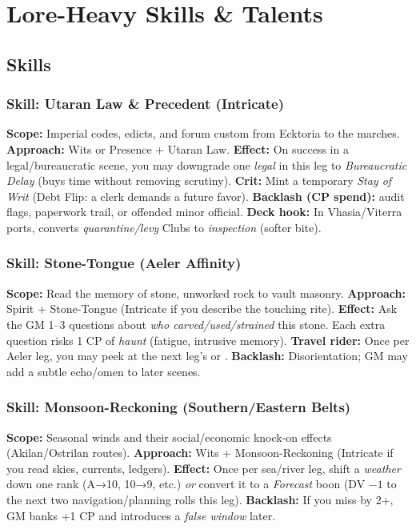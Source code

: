 \chapter{Lore-Heavy Skills \& Talents}

\section{Skills}

\subsection{Skill: Utaran Law \& Precedent (Intricate)}
\textbf{Scope:} Imperial codes, edicts, and forum custom from Ecktoria to the marches.
\textbf{Approach:} Wits or Presence + Utaran Law.
\textbf{Effect:} On success in a legal/bureaucratic scene, you may downgrade one \emph{legal} \SuitClub{} in this leg to \emph{Bureaucratic Delay} (buys time without removing scrutiny).
\textbf{Crit:} Mint a temporary \SuitDiamond{} \emph{Stay of Writ} (Debt Flip: a clerk demands a future favor).
\textbf{Backlash (CP spend):} audit flags, paperwork trail, or offended minor official.
\textbf{Deck hook:} In Vhasia/Viterra ports, converts \emph{quarantine/levy} Clubs to \emph{inspection} (softer bite).

\subsection{Skill: Stone-Tongue (Aeler Affinity)}
\textbf{Scope:} Read the memory of stone, unworked rock to vault masonry.
\textbf{Approach:} Spirit + Stone-Tongue (Intricate if you describe the touching rite).
\textbf{Effect:} Ask the GM 1--3 questions about \emph{who carved/used/strained} this stone. Each extra question risks 1 CP of \emph{haunt} (fatigue, intrusive memory).
\textbf{Travel rider:} Once per Aeler leg, you may peek at the next leg’s \SuitSpade{} or \SuitClub{}.
\textbf{Backlash:} Disorientation; GM may add a subtle echo/omen to later scenes.

\subsection{Skill: Monsoon-Reckoning (Southern/Eastern Belts)}
\textbf{Scope:} Seasonal winds and their social/economic knock-on effects (Akilan/Ostrilan routes).
\textbf{Approach:} Wits + Monsoon-Reckoning (Intricate if you read skies, currents, ledgers).
\textbf{Effect:} Once per sea/river leg, shift a \emph{weather} \SuitClub{} down one rank (A→10, 10→9, etc.) \emph{or} convert it to a \emph{Forecast} boon (DV $-1$ to the next two navigation/planning rolls this leg).
\textbf{Backlash:} If you miss by 2+, GM banks +1 CP and introduces a \emph{false window} later.

